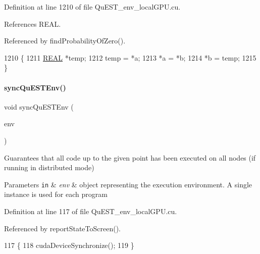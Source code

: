 Definition at line 1210 of file Qu\+E\+S\+T\+\_\+env\+\_\+local\+G\+P\+U.\+cu.



References R\+E\+AL.



Referenced by find\+Probability\+Of\+Zero().


\begin{DoxyCode}
1210                                    \{
1211     \mbox{\hyperlink{QuEST__precision_8h_a4b654506f18b8bfd61ad2a29a7e38c25}{REAL}} *temp;
1212     temp = *a;
1213     *a = *b;
1214     *b = temp;
1215 \}
\end{DoxyCode}
\mbox{\label{QuEST__env__localGPU_8cu_a8d31fe2d1ad4d01e2a1f5f6b8bc15b77}} 
\paragraph{\texorpdfstring{sync\+Qu\+E\+S\+T\+Env()}{syncQuESTEnv()}}
{\footnotesize\ttfamily void sync\+Qu\+E\+S\+T\+Env (\begin{DoxyParamCaption}\item[{\mbox{\hyperlink{structQuESTEnv}{Qu\+E\+S\+T\+Env}}}]{env }\end{DoxyParamCaption})}



Guarantees that all code up to the given point has been executed on all nodes (if running in distributed mode) 


\begin{DoxyParams}[1]{Parameters}
\mbox{\tt in}  & {\em env} & object representing the execution environment. A single instance is used for each program \\
\hline
\end{DoxyParams}


Definition at line 117 of file Qu\+E\+S\+T\+\_\+env\+\_\+local\+G\+P\+U.\+cu.



Referenced by report\+State\+To\+Screen().


\begin{DoxyCode}
117                                \{
118     cudaDeviceSynchronize();
119 \} 
\end{DoxyCode}
\mbox{\label{QuEST__env__localGPU_8cu_ac7e38d768a1bd79019f88cc1e6295092}} 
